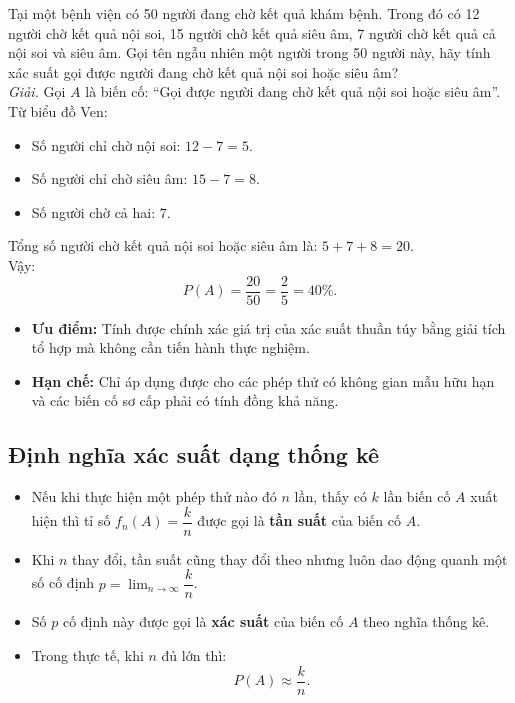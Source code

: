 \begin{vidu}
Tại một bệnh viện có 50 người đang chờ kết quả khám bệnh. Trong đó có 12 người chờ kết quả nội soi, 15 người chờ kết quả siêu âm, 7 người chờ kết quả cả nội soi và siêu âm. Gọi tên ngẫu nhiên một người trong 50 người này, hãy tính xác suất gọi được người đang chờ kết quả nội soi hoặc siêu âm?\\
\textit{Giải.} Gọi $A$ là biến cố: ``Gọi được người đang chờ kết quả nội soi hoặc siêu âm''.
Từ biểu đồ Ven:
\begin{itemize}
    \item Số người chỉ chờ nội soi: $12 - 7 = 5$.
    \item Số người chỉ chờ siêu âm: $15 - 7 = 8$.
    \item Số người chờ cả hai: $7$.
\end{itemize}
Tổng số người chờ kết quả nội soi hoặc siêu âm là: $5 + 7 + 8 = 20$.\\
Vậy:
\[
P(A) = \frac{20}{50} = \frac{2}{5} = 40\%.
\]
\end{vidu}

\begin{chuy}
\begin{itemize}
    \item \textbf{Ưu điểm:} Tính được chính xác giá trị của xác suất thuần túy bằng giải tích tổ hợp mà không cần tiến hành thực nghiệm.
    \item \textbf{Hạn chế:} Chỉ áp dụng được cho các phép thử có không gian mẫu hữu hạn và các biến cố sơ cấp phải có tính đồng khả năng.
\end{itemize}
\end{chuy}

\subsection{Định nghĩa xác suất dạng thống kê}
\begin{itemize}[leftmargin=1.5em]
    \item Nếu khi thực hiện một phép thử nào đó $n$ lần, thấy có $k$ lần biến cố $A$ xuất hiện thì tỉ số $f_n(A) = \dfrac{k}{n}$ được gọi là \textbf{tần suất} của biến cố $A$.
    \item Khi $n$ thay đổi, tần suất cũng thay đổi theo nhưng luôn dao động quanh một số cố định $p = \lim_{n \to \infty} \dfrac{k}{n}$.
    \item Số $p$ cố định này được gọi là \textbf{xác suất} của biến cố $A$ theo nghĩa thống kê.
    \item Trong thực tế, khi $n$ đủ lớn thì:
    \[
    P(A) \approx \frac{k}{n}.
    \]
\end{itemize}

